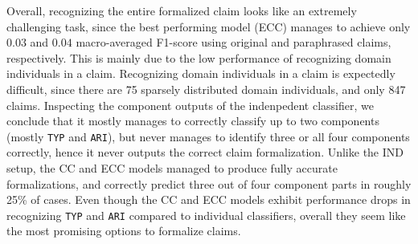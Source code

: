 Overall, recognizing the entire formalized claim looks like an extremely
challenging task, since the best performing model (ECC) manages to achieve
only $0.03$ and $0.04$ macro-averaged F1-score
using original and paraphrased claims, respectively. This is mainly due
to the low performance of recognizing domain individuals in a claim.
Recognizing domain individuals in a claim is expectedly difficult, since there
are 75 sparsely distributed domain individuals, and only 847 claims.
Inspecting the component outputs of the indenpedent classifier, we conclude
that it mostly manages to correctly classify up to two components (mostly \texttt{TYP}
and \texttt{ARI}), but never manages to identify three or all four
components correctly, hence it never outputs the correct claim formalization. 
Unlike the IND setup, the CC and ECC models managed to produce fully
accurate formalizations, and correctly predict three out of four component parts
in roughly 25\% of cases.
Even though the CC and ECC models exhibit performance drops in recognizing
\texttt{TYP} and \texttt{ARI} compared to individual classifiers, overall they seem like the most
promising options to formalize claims. 

